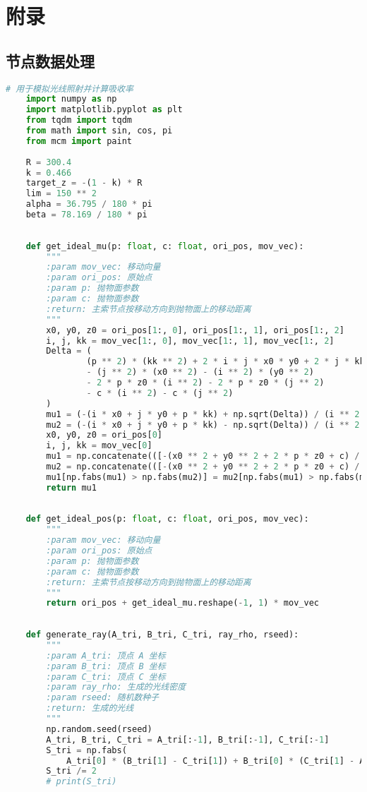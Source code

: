 \documentclass[withoutpreface,bwprint,fontset=macnew]{cumcmthesis} %
\begin{document}
	\section{附录}
	\begin{appendices}
	\section{节点数据处理}
	\begin{lstlisting}[language=python]
		# 用于模拟光线照射并计算吸收率
	import numpy as np
	import matplotlib.pyplot as plt
	from tqdm import tqdm
	from math import sin, cos, pi
	from mcm import paint
	
	R = 300.4
	k = 0.466
	target_z = -(1 - k) * R
	lim = 150 ** 2
	alpha = 36.795 / 180 * pi
	beta = 78.169 / 180 * pi
	
	
	def get_ideal_mu(p: float, c: float, ori_pos, mov_vec):
	    """
	    :param mov_vec: 移动向量
	    :param ori_pos: 原始点
	    :param p: 抛物面参数
	    :param c: 抛物面参数
	    :return: 主索节点按移动方向到抛物面上的移动距离
	    """
	    x0, y0, z0 = ori_pos[1:, 0], ori_pos[1:, 1], ori_pos[1:, 2]
	    i, j, kk = mov_vec[1:, 0], mov_vec[1:, 1], mov_vec[1:, 2]
	    Delta = (
	            (p ** 2) * (kk ** 2) + 2 * i * j * x0 * y0 + 2 * j * kk * p * y0 + 2 * i * kk * p * x0
	            - (j ** 2) * (x0 ** 2) - (i ** 2) * (y0 ** 2)
	            - 2 * p * z0 * (i ** 2) - 2 * p * z0 * (j ** 2)
	            - c * (i ** 2) - c * (j ** 2)
	    )
	    mu1 = (-(i * x0 + j * y0 + p * kk) + np.sqrt(Delta)) / (i ** 2 + j ** 2)
	    mu2 = (-(i * x0 + j * y0 + p * kk) - np.sqrt(Delta)) / (i ** 2 + j ** 2)
	    x0, y0, z0 = ori_pos[0]
	    i, j, kk = mov_vec[0]
	    mu1 = np.concatenate(([-(x0 ** 2 + y0 ** 2 + 2 * p * z0 + c) / (2 * p * kk)], mu1))
	    mu2 = np.concatenate(([-(x0 ** 2 + y0 ** 2 + 2 * p * z0 + c) / (2 * p * kk)], mu2))
	    mu1[np.fabs(mu1) > np.fabs(mu2)] = mu2[np.fabs(mu1) > np.fabs(mu2)]
	    return mu1
	
	
	def get_ideal_pos(p: float, c: float, ori_pos, mov_vec):
	    """
	    :param mov_vec: 移动向量
	    :param ori_pos: 原始点
	    :param p: 抛物面参数
	    :param c: 抛物面参数
	    :return: 主索节点按移动方向到抛物面上的移动距离
	    """
	    return ori_pos + get_ideal_mu.reshape(-1, 1) * mov_vec
	
	
	def generate_ray(A_tri, B_tri, C_tri, ray_rho, rseed):
	    """
	    :param A_tri: 顶点 A 坐标
	    :param B_tri: 顶点 B 坐标
	    :param C_tri: 顶点 C 坐标
	    :param ray_rho: 生成的光线密度
	    :param rseed: 随机数种子
	    :return: 生成的光线
	    """
	    np.random.seed(rseed)
	    A_tri, B_tri, C_tri = A_tri[:-1], B_tri[:-1], C_tri[:-1]
	    S_tri = np.fabs(
	        A_tri[0] * (B_tri[1] - C_tri[1]) + B_tri[0] * (C_tri[1] - A_tri[1]) + C_tri[0] * (A_tri[1] - B_tri[1]))
	    S_tri /= 2
	    # print(S_tri)
	

\end{lstlisting}
\end{appendices}
\end{document}
